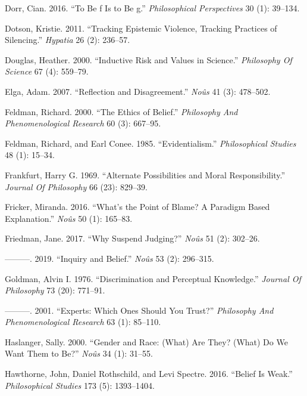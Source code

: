 \documentclass[
  10pt,
  letterpaper,
  DIV=11,
  numbers=noendperiod,
  twoside]{scrartcl}
\newlength{\cslhangindent}
\newenvironment{CSLReferences}[2] %
 {\begin{list}{}{%
  \setlength{\itemindent}{0pt}
  \setlength{\leftmargin}{0pt}
  \setlength{\parsep}{0pt}
  \ifodd #1
   \setlength{\leftmargin}{\cslhangindent}
   \setlength{\itemindent}{-1\cslhangindent}
  \fi
  \setlength{\itemsep}{#2\baselineskip}}}
 {\end{list}}
\begin{document}
\begin{CSLReferences}{1}{0}
Dorr, Cian. 2016. {``To Be f Is to Be g.''} \emph{Philosophical
Perspectives} 30 (1): 39--134.

Dotson, Kristie. 2011. {``Tracking Epistemic Violence, Tracking
Practices of Silencing.''} \emph{Hypatia} 26 (2): 236--57.

Douglas, Heather. 2000. {``Inductive Risk and Values in Science.''}
\emph{Philosophy Of Science} 67 (4): 559--79.

Elga, Adam. 2007. {``Reflection and Disagreement.''} \emph{Noûs} 41 (3):
478--502.

Feldman, Richard. 2000. {``The Ethics of Belief.''} \emph{Philosophy And
Phenomenological Research} 60 (3): 667--95.

Feldman, Richard, and Earl Conee. 1985. {``Evidentialism.''}
\emph{Philosophical Studies} 48 (1): 15--34.

Frankfurt, Harry G. 1969. {``Alternate Possibilities and Moral
Responsibility.''} \emph{Journal Of Philosophy} 66 (23): 829--39.

Fricker, Miranda. 2016. {``What's the Point of Blame? A Paradigm Based
Explanation.''} \emph{Noûs} 50 (1): 165--83.

Friedman, Jane. 2017. {``Why Suspend Judging?''} \emph{Noûs} 51 (2):
302--26.

---------. 2019. {``Inquiry and Belief.''} \emph{Noûs} 53 (2): 296--315.

Goldman, Alvin I. 1976. {``Discrimination and Perceptual Knowledge.''}
\emph{Journal Of Philosophy} 73 (20): 771--91.

---------. 2001. {``Experts: Which Ones Should You Trust?''}
\emph{Philosophy And Phenomenological Research} 63 (1): 85--110.

Haslanger, Sally. 2000. {``Gender and Race: (What) Are They? (What) Do
We Want Them to Be?''} \emph{Noûs} 34 (1): 31--55.

Hawthorne, John, Daniel Rothschild, and Levi Spectre. 2016. {``Belief Is
Weak.''} \emph{Philosophical Studies} 173 (5): 1393--1404.


\end{CSLReferences}
\end{document}
